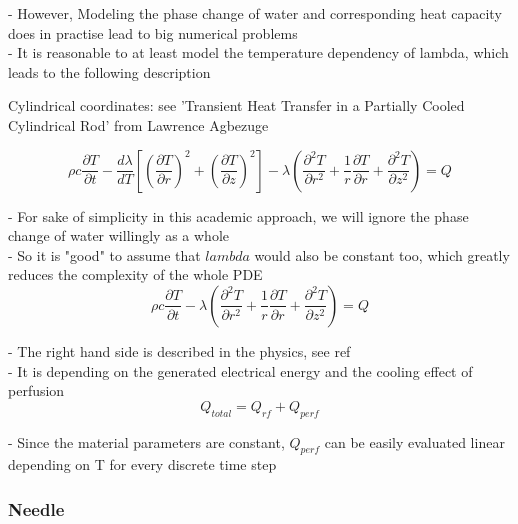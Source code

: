 \documentclass[parskip=half, titlepage=yes, 12pt, BCOR=12mm, DIV=calc]{scrartcl}
\begin{document}
- However, Modeling the phase change of water and corresponding heat capacity does in practise lead to big numerical problems \\

- It is reasonable to at least model the temperature dependency of lambda, which leads to the following description

Cylindrical coordinates: see 'Transient Heat Transfer in a Partially Cooled Cylindrical Rod' from Lawrence Agbezuge

\begin{equation}
    \rho c \frac{\partial T}{\partial t} -  \frac{d\lambda}{dT} \left[ \left( \frac{\partial T}{\partial r} \right)^2 + \left( \frac{\partial T}{\partial z} \right)^2 \right] - \lambda \left( \frac{\partial^2 T}{\partial r^2} + \frac{1}{r} \frac{\partial T}{\partial r} + \frac{\partial^2 T}{\partial z^2} \right) = Q
\end{equation}

- For sake of simplicity in this academic approach, we will ignore the phase change of water willingly as a whole \\

- So it is "good" to assume that $lambda$ would also be constant too, which greatly reduces the complexity of the whole PDE \\

\begin{equation}
    \rho c \frac{\partial T}{\partial t} - \lambda \left( \frac{\partial^2 T}{\partial r^2} + \frac{1}{r} \frac{\partial T}{\partial r} + \frac{\partial^2 T}{\partial z^2} \right) = Q
\end{equation}

- The right hand side is described in the physics, see ref\\
- It is depending on the generated electrical energy and the cooling effect of perfusion \\

\begin{equation}
    Q_{total} = Q_{rf} + Q_{perf}
\end{equation}

- Since the material parameters are constant, $Q_{perf}$ can be easily evaluated linear depending on T for every discrete time step \\

\subsubsection{Needle}
\end{document}

